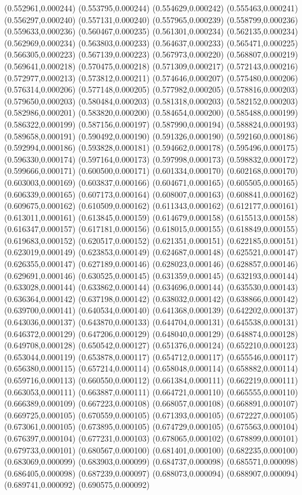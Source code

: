 {(0.552961,0.000244) (0.553795,0.000244) (0.554629,0.000242) (0.555463,0.000241) (0.556297,0.000240) (0.557131,0.000240) (0.557965,0.000239) (0.558799,0.000236) (0.559633,0.000236) (0.560467,0.000235) (0.561301,0.000234) (0.562135,0.000234) (0.562969,0.000234) (0.563803,0.000233) (0.564637,0.000233) (0.565471,0.000225) (0.566305,0.000223) (0.567139,0.000223) (0.567973,0.000220) (0.568807,0.000219) (0.569641,0.000218) (0.570475,0.000218) (0.571309,0.000217) (0.572143,0.000216) (0.572977,0.000213) (0.573812,0.000211) (0.574646,0.000207) (0.575480,0.000206) (0.576314,0.000206) (0.577148,0.000205) (0.577982,0.000205) (0.578816,0.000203) (0.579650,0.000203) (0.580484,0.000203) (0.581318,0.000203) (0.582152,0.000203) (0.582986,0.000201) (0.583820,0.000200) (0.584654,0.000200) (0.585488,0.000199) (0.586322,0.000199) (0.587156,0.000197) (0.587990,0.000194) (0.588824,0.000193) (0.589658,0.000191) (0.590492,0.000190) (0.591326,0.000190) (0.592160,0.000186) (0.592994,0.000186) (0.593828,0.000181) (0.594662,0.000178) (0.595496,0.000175) (0.596330,0.000174) (0.597164,0.000173) (0.597998,0.000173) (0.598832,0.000172) (0.599666,0.000171) (0.600500,0.000171) (0.601334,0.000170) (0.602168,0.000170) (0.603003,0.000169) (0.603837,0.000166) (0.604671,0.000165) (0.605505,0.000165) (0.606339,0.000165) (0.607173,0.000164) (0.608007,0.000163) (0.608841,0.000162) (0.609675,0.000162) (0.610509,0.000162) (0.611343,0.000162) (0.612177,0.000161) (0.613011,0.000161) (0.613845,0.000159) (0.614679,0.000158) (0.615513,0.000158) (0.616347,0.000157) (0.617181,0.000156) (0.618015,0.000155) (0.618849,0.000155) (0.619683,0.000152) (0.620517,0.000152) (0.621351,0.000151) (0.622185,0.000151) (0.623019,0.000149) (0.623853,0.000149) (0.624687,0.000148) (0.625521,0.000147) (0.626355,0.000147) (0.627189,0.000146) (0.628023,0.000146) (0.628857,0.000146) (0.629691,0.000146) (0.630525,0.000145) (0.631359,0.000145) (0.632193,0.000144) (0.633028,0.000144) (0.633862,0.000144) (0.634696,0.000144) (0.635530,0.000143) (0.636364,0.000142) (0.637198,0.000142) (0.638032,0.000142) (0.638866,0.000142) (0.639700,0.000141) (0.640534,0.000140) (0.641368,0.000139) (0.642202,0.000137) (0.643036,0.000137) (0.643870,0.000133) (0.644704,0.000131) (0.645538,0.000131) (0.646372,0.000129) (0.647206,0.000129) (0.648040,0.000129) (0.648874,0.000128) (0.649708,0.000128) (0.650542,0.000127) (0.651376,0.000124) (0.652210,0.000123) (0.653044,0.000119) (0.653878,0.000117) (0.654712,0.000117) (0.655546,0.000117) (0.656380,0.000115) (0.657214,0.000114) (0.658048,0.000114) (0.658882,0.000114) (0.659716,0.000113) (0.660550,0.000112) (0.661384,0.000111) (0.662219,0.000111) (0.663053,0.000111) (0.663887,0.000111) (0.664721,0.000110) (0.665555,0.000110) (0.666389,0.000109) (0.667223,0.000108) (0.668057,0.000108) (0.668891,0.000107) (0.669725,0.000105) (0.670559,0.000105) (0.671393,0.000105) (0.672227,0.000105) (0.673061,0.000105) (0.673895,0.000105) (0.674729,0.000105) (0.675563,0.000104) (0.676397,0.000104) (0.677231,0.000103) (0.678065,0.000102) (0.678899,0.000101) (0.679733,0.000101) (0.680567,0.000100) (0.681401,0.000100) (0.682235,0.000100) (0.683069,0.000099) (0.683903,0.000099) (0.684737,0.000098) (0.685571,0.000098) (0.686405,0.000098) (0.687239,0.000097) (0.688073,0.000094) (0.688907,0.000094) (0.689741,0.000092) (0.690575,0.000092) }
